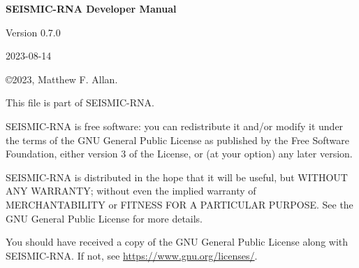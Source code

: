 \documentclass[main.tex]{subfiles}
\begin{document}
\begin{titlepage}

\begin{center}

\textbf{SEISMIC-RNA Developer Manual}

\vspace{0.5cm}

Version 0.7.0

2023-08-14

\end{center}

\vspace{1cm}

\noindent
\copyright 2023, Matthew F. Allan.

\vspace{0.5cm}

\noindent
This file is part of SEISMIC-RNA.

\vspace{0.25cm}

\noindent
SEISMIC-RNA is free software: you can redistribute it and/or modify it under the terms of the GNU General Public License as published by the Free Software Foundation, either version 3 of the License, or (at your option) any later version.

\vspace{0.25cm}

\noindent
SEISMIC-RNA is distributed in the hope that it will be useful, but WITHOUT ANY WARRANTY; without even the implied warranty of MERCHANTABILITY or FITNESS FOR A PARTICULAR PURPOSE. See the GNU General Public License for more details.

\vspace{0.25cm}

\noindent
You should have received a copy of the GNU General Public License along with SEISMIC-RNA. If not, see \url{https://www.gnu.org/licenses/}.

\end{titlepage}
\end{document}
